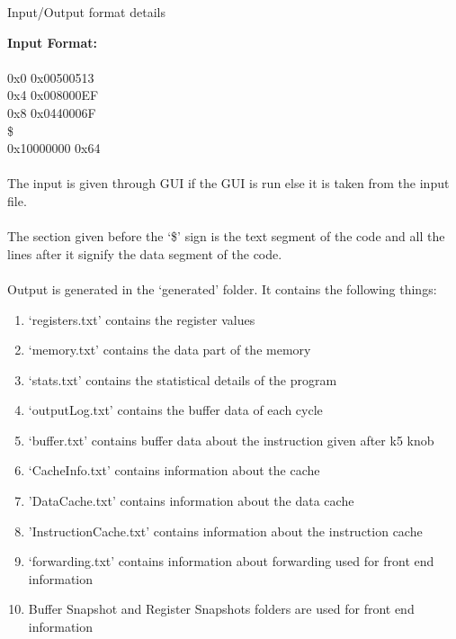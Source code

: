 \documentclass{article}
\begin{document}
\newpage
\begin{centering}
\begin{Huge}
\textsf{Input/Output format details}\\
\end{Huge}
\vspace{0.6cm}
\end{centering}
\noindent
\LARGE
{\bf Input Format:}\\\\
0x0 0x00500513\\
0x4 0x008000EF\\
0x8 0x0440006F\\
\$\\
0x10000000 0x64\\\\
The input is given through GUI if the GUI is run else it is taken from the input file.\\\\
The section given before the `\$' sign is the text segment of the code and all the lines after it signify the data segment of the code.\\\\
Output is generated in the `generated' folder. It contains the following things:  \\
\begin{enumerate}
    \item `registers.txt' contains the register values
    \item `memory.txt' contains the data part of the memory
    \item `stats.txt' contains the statistical details of the program
    \item `outputLog.txt' contains the buffer data of each cycle
    \item `buffer.txt' contains buffer data about the instruction given after k5 knob
    \item `CacheInfo.txt' contains information about the cache
    \item 'DataCache.txt' contains information about the data cache
    \item 'InstructionCache.txt' contains information about the instruction cache
    \item `forwarding.txt' contains information about forwarding used for front end information
    \item Buffer Snapshot and Register Snapshots folders are used for front end information
    
\end{enumerate}
\end{document}
